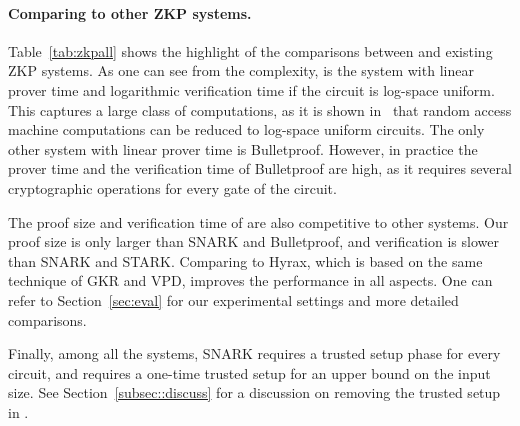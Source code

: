 \paragraph{Comparing to other ZKP systems.} Table~\ref{tab:zkpall} shows the highlight of the comparisons between \name and existing ZKP systems. As one can see from the complexity, \name is the system with linear prover time and logarithmic verification time if the circuit is log-space uniform. This captures a large class of computations, as it is shown in~\cite{libsnark,vram,libstark} that random access machine computations can be reduced to log-space uniform circuits. The only other system with linear prover time is Bulletproof. However, in practice the prover time and the verification time of Bulletproof are high, as it requires several cryptographic operations for every gate of the circuit.

The proof size and verification time of \name are also competitive to other systems. Our proof size is only larger than SNARK and Bulletproof, and verification is slower than SNARK and STARK. Comparing to Hyrax, which is based on the same technique of GKR and VPD, \name improves the performance in all aspects. One can refer to Section~\ref{sec:eval} for our experimental settings and more detailed comparisons. 
 
Finally, among all the systems, SNARK requires a trusted setup phase for every circuit, and \name requires a one-time trusted setup for an upper bound on the input size. See Section~\ref{subsec::discuss} for a discussion on removing the trusted setup in \name. 




